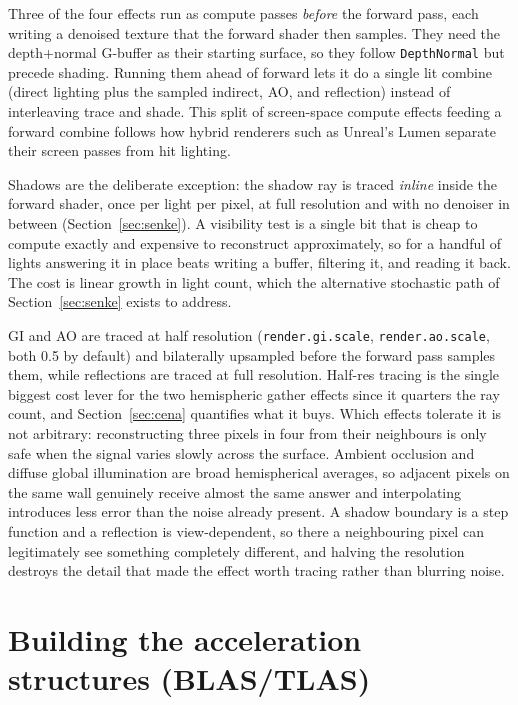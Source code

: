 Three of the four effects run as compute passes \emph{before} the forward pass, each writing a
denoised texture that the forward shader then samples. They need the depth+normal G-buffer as their
starting surface, so they follow \texttt{DepthNormal} but precede shading. Running them ahead of
forward lets it do a single lit combine (direct lighting plus the sampled indirect, AO, and
reflection) instead of interleaving trace and shade. This split of screen-space compute effects
feeding a forward combine follows how hybrid renderers such as Unreal's Lumen separate their screen
passes from hit lighting.

Shadows are the deliberate exception: the shadow ray is traced \emph{inline} inside the forward
shader, once per light per pixel, at full resolution and with no denoiser in between
(Section~\ref{sec:senke}). A visibility test is a single bit that is cheap to compute exactly and
expensive to reconstruct approximately, so for a handful of lights answering it in place beats
writing a buffer, filtering it, and reading it back. The cost is linear growth in light count, which
the alternative stochastic path of Section~\ref{sec:senke} exists to address.

GI and AO are traced at half resolution (\texttt{render.gi.scale}, \texttt{render.ao.scale}, both
0.5 by default) and bilaterally upsampled before the forward pass samples them, while reflections are
traced at full resolution. Half-res tracing is the single biggest cost lever for the two hemispheric
gather effects since it quarters the ray count, and Section~\ref{sec:cena} quantifies what it buys.
Which effects tolerate it is not arbitrary: reconstructing three pixels in four from their neighbours
is only safe when the signal varies slowly across the surface. Ambient occlusion and diffuse global
illumination are broad hemispherical averages, so adjacent pixels on the same wall genuinely receive
almost the same answer and interpolating introduces less error than the noise already present. A
shadow boundary is a step function and a reflection is view-dependent, so there a neighbouring pixel
can legitimately see something completely different, and halving the resolution destroys the detail
that made the effect worth tracing rather than blurring noise.

\section{Building the acceleration structures (BLAS/TLAS)}
\label{sec:accel}

